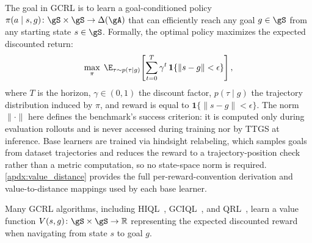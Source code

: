 \documentclass{article} %
\begin{document}
The goal in GCRL is to learn a goal-conditioned policy $\pi(a \mid s, g)\colon \gS \times \gS \to \Delta(\gA)$ that can efficiently reach any goal $g \in \gS$ from any starting state $s \in \gS$.
Formally, the optimal policy maximizes the expected discounted return:
\[
    \max_{\pi} \; \E_{\tau \sim p(\tau \mid g)}\!\left[\sum_{t=0}^T \gamma^t \, \mathbf{1}\{\|s - g\| < \epsilon\}\right],
\]
where $T$ is the horizon, $\gamma \in (0,1)$ the discount factor, $p(\tau \mid g)$ the trajectory distribution induced by $\pi$, and reward is equal to $\mathbf{1}\{\|s - g\| < \epsilon\}$. The norm $\|\cdot\|$ here defines the benchmark's success criterion: it is computed only during evaluation rollouts and is never accessed during training nor by TTGS at inference. Base learners are trained via hindsight relabeling, which samples goals from dataset trajectories and reduces the reward to a trajectory-position check rather than a metric computation, so no state-space norm is required. \autoref{apdx:value_distance} provides the full per-reward-convention derivation and value-to-distance mappings used by each base learner.

Many GCRL algorithms, including HIQL~\citep{park2024hiqlofflinegoalconditionedrl}, GCIQL~\citep{Kostrikov2022}, and QRL~\citep{tongzhouw2023qrl}, learn a value function
$V(s, g)\colon \gS \times \gS \to \mathbb{R}$ representing the expected discounted reward when navigating from state $s$ to goal $g$.
\end{document}
